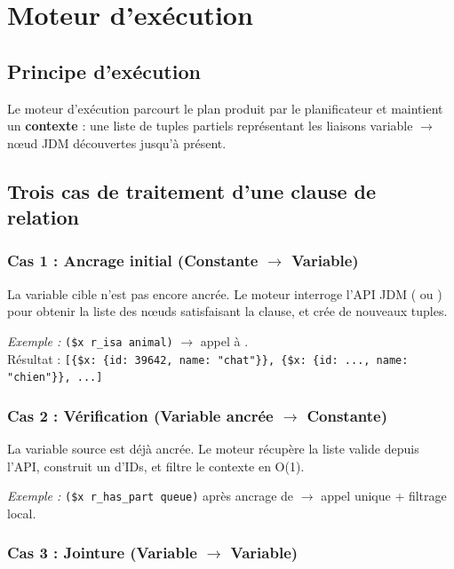 \chapter{Moteur d'exécution}
\label{chap:moteur}

\section{Principe d'exécution}

Le moteur d'exécution parcourt le plan produit par le planificateur et maintient un \textbf{contexte} : une liste de tuples partiels représentant les liaisons variable $\rightarrow$ nœud JDM découvertes jusqu'à présent.

\section{Trois cas de traitement d'une clause de relation}

\subsection{Cas 1 : Ancrage initial (Constante $\rightarrow$ Variable)}

La variable cible n'est pas encore ancrée. Le moteur interroge l'API JDM ( ou ) pour obtenir la liste des nœuds satisfaisant la clause, et crée de nouveaux tuples.

\textit{Exemple :} \texttt{(\$x r\_isa animal)} $\rightarrow$ appel à . \\
Résultat : \texttt{[\{\$x: \{id: 39642, name: "chat"\}\}, \{\$x: \{id: ..., name: "chien"\}\}, ...]}

\subsection{Cas 2 : Vérification (Variable ancrée $\rightarrow$ Constante)}

La variable source est déjà ancrée. Le moteur récupère la liste valide depuis l'API, construit un  d'IDs, et filtre le contexte en O(1).

\textit{Exemple :} \texttt{(\$x r\_has\_part queue)} après ancrage de  $\rightarrow$ appel unique + filtrage local.

\subsection{Cas 3 : Jointure (Variable $\rightarrow$ Variable)}

